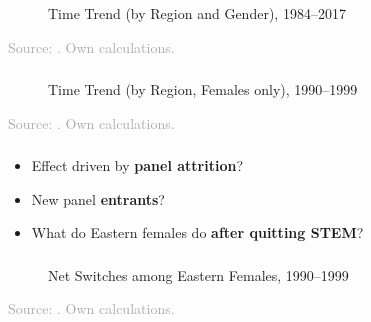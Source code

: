 \documentclass[11pt, aspectratio=1610, xcolor={dvipsnames}]{beamer}
\newcommand{\highlight}[1]{\textbf{\textcolor{PineGreen}{#1}}}
\begin{document}
	\begin{frame}
		\frametitle{}
		
		\hypertarget{graph}{}
		
		\begin{figure}[h]
			\centering
			\caption{Time Trend (by Region and Gender), 1984--2017}
			\label{fig:trend_highlight}
			\resizebox{75mm}{!}{}
		\end{figure}
		
		{\scriptsize
			\textcolor{darkgray}{Source: \cite{SOEP2023}. Own calculations.}
		}
		
	\end{frame}
	
	\begin{frame}
		\frametitle{}
		
		\begin{figure}[h]
			\centering
			\caption{Time Trend (by Region, Females only), 1990--1999}
			\label{fig:trend_zoomed}
			\resizebox{75mm}{!}{}
		\end{figure}
		
		{\scriptsize
			\textcolor{darkgray}{Source: \cite{SOEP2023}. Own calculations.}
		}
		
	\end{frame}
	
	\begin{frame}
		\frametitle{}
		
		\begin{itemize}
			\item Effect driven by \highlight{panel attrition}?
			\item New panel \highlight{entrants}?
			\item What do Eastern females do \highlight{after quitting STEM}?
		\end{itemize}
		
	\end{frame}
	
	\begin{frame}
		\frametitle{}
		
		\begin{figure}[h]
			\centering
			\caption{Net Switches among Eastern Females, 1990--1999}
			\label{fig:eastern_female_tracking}
			\resizebox{75mm}{!}{}
		\end{figure}
		
		{\scriptsize
			\textcolor{darkgray}{Source: \cite{SOEP2023}. Own calculations.}
		}
		
	\end{frame}
	
\end{document}
